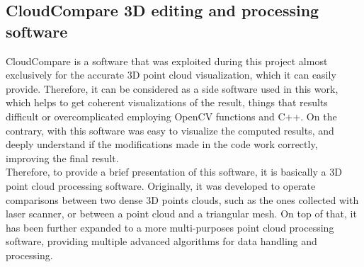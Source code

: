 \subsection{CloudCompare 3D editing and processing software}
\label{subsection:cloud-compare-env}

CloudCompare is a software that was exploited during this project almost exclusively for the accurate 3D point cloud visualization, which it can easily provide.
Therefore, it can be considered as a side software used in this work, which helps to get coherent visualizations of the result, things that results difficult or overcomplicated employing OpenCV functions and C++. 
On the contrary, with this software was easy to visualize the computed results, and deeply understand if the modifications made in the code work correctly, improving the final result.\\
Therefore, to provide a brief presentation of this software, it is basically a 3D point cloud processing software.
Originally, it was developed to operate comparisons between two dense 3D points clouds, such as the ones collected with laser scanner, or between a point cloud and a triangular mesh.
On top of that, it has been further expanded to a more multi-purposes point cloud processing software, providing multiple advanced algorithms for data handling and processing. 

